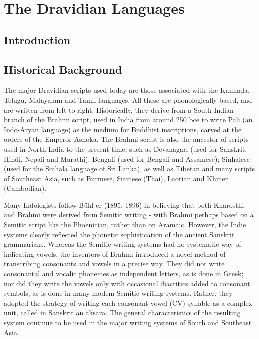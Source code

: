 \chapter{The Dravidian Languages}

\section{Introduction}



\section{Historical Background}

The major Dravidian scripts used today are those associated with the Kannada,
Telugu, Malayalam and Tamil languages. All these are phonologically based,
and are written from left to right. Historically, they derive from a South Indian
branch of the Brahmi script, used in India from around 250 bce to write Pali (an
Indo-Aryan language) as the medium for Buddhist inscriptions, carved at the orders
of the Emperor Ashoka. The Brahmi script is also the ancestor of scripts
used in North India to the present time, such as Devanagari (used for Sanskrit,
Hindi, Nepali and Marathi); Bengali (used for Bengali and Assamese); Sinhalese
(used for the Sinhala language of Sri Lanka), as well as Tibetan and many
scripts of Southeast Asia, such as Burmese, Siamese (Thai), Laotian and Khmer
(Cambodian).

Many Indologists follow Bühl er (1895, 1896) in believing that both Kharosthi
and Brahmi were derived from Semitic writing - with Brahmi perhaps based on
a Semitic script like the Phoenician, rather than on Aramaic. However, the Indie
systems clearly reflected the phonetic sophistication of the ancient Sanskrit
grammarians. Whereas the Semitic writing systems had no systematic way of indicating
vowels, the inventors of Brahmi introduced a novel method of transcribing
consonants and vowels in a precise way. They did not write consonantal and
vocalic phonemes as independent letters, as is done in Greek; nor did they write
the vowels only with occasional diacritics added to consonant symbols, as is
done in many modem Semitic writing systems. Rather, they adopted the strategy
of writing each consonant-vowel (CV) syllable as a complex unit, called in Sanskrit
an aksara. The general characteristics of the resulting system continue to
be used in the major writing systems of South and Southeast Asia.


